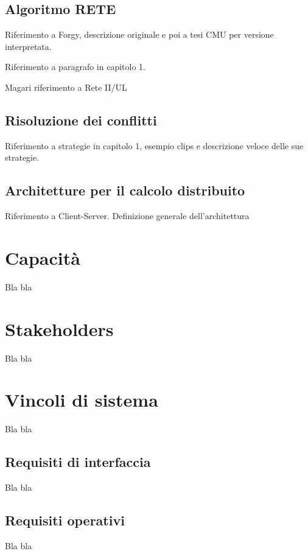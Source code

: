 \subsection{Algoritmo RETE}

Riferimento a Forgy, descrizione originale e poi a tesi CMU per versione interpretata.

Riferimento a paragrafo in capitolo 1.

Magari riferimento a Rete II/UL

\subsection{Risoluzione dei conflitti}

Riferimento a strategie in capitolo 1, esempio clips e descrizione veloce delle sue strategie.

\subsection{Architetture per il calcolo distribuito}

Riferimento a Client-Server. Definizione generale dell'architettura

\section{Capacità}

Bla bla

\section{Stakeholders}

Bla bla

\section{Vincoli di sistema}

Bla bla

\subsection{Requisiti di interfaccia}

Bla bla

\subsection{Requisiti operativi}

Bla bla

